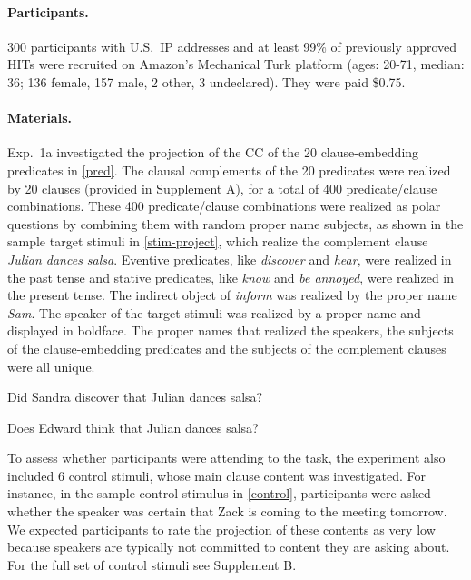 \documentclass{language}
\newcommand{\6}{\mbox{$[\hspace*{-.6mm}[$}}
\newcommand{\9}{\mbox{$]\hspace*{-.6mm}]$}}
\begin{document}

\paragraph{Participants.} 300 participants with U.S.\ IP addresses and at least 99\% of previously approved HITs were recruited on Amazon's Mechanical Turk platform (ages: 20-71, median: 36; 136 female, 157 male, 2 other, 3 undeclared). They were paid \$0.75.

\paragraph{Materials.} Exp.~1a investigated the projection of the CC of the 20 clause-embedding predicates in \ref{pred}.  The clausal complements of the 20 predicates were realized by 20 clauses (provided in Supplement A), for a total of 400 predicate/clause combinations. These 400 predicate/clause combinations were realized as polar questions by combining them with random proper name subjects, as shown in the sample target stimuli in \ref{stim-project}, which realize the complement clause {\em Julian dances salsa}. Eventive predicates, like {\em discover} and {\em hear}, were realized in the past tense and stative predicates, like {\em know} and {\em be annoyed}, were realized in the present tense. The indirect object of {\em inform} was realized by the proper name {\em Sam}.  The speaker of the target stimuli was realized by a proper name and displayed in boldface. The proper names that realized the speakers, the subjects of the clause-embedding predicates and the subjects of the complement clauses were all unique.

\begin{exe}
\ex\label{stim-project} 
\begin{xlist}
 Did Sandra discover that Julian dances salsa?

 Does Edward think that Julian dances salsa?
\end{xlist}
\end{exe}

To assess whether participants were attending to the task, the experiment also included 6 control stimuli, whose main clause content was investigated. For instance, in the sample control stimulus in \ref{control}, participants were asked whether the speaker was certain that Zack is coming to the meeting tomorrow. We expected participants to rate the projection of these contents as very low because speakers are typically not committed to content they are asking about. For the full set of control stimuli see Supplement B.
\end{document}

